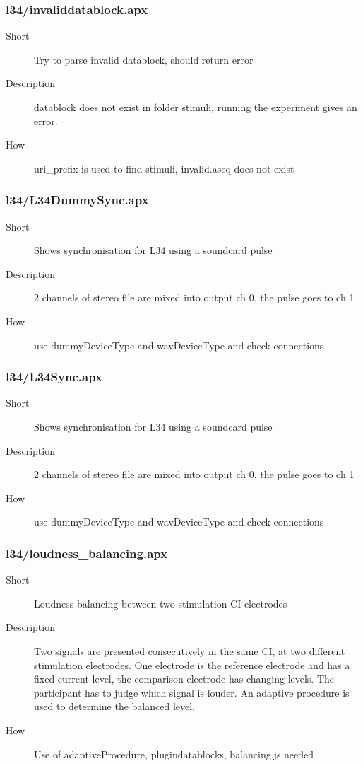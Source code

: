 \subsubsection{l34/invaliddatablock.apx}
\begin{description}
\item[Short] 
 Try to parse invalid datablock, should return error
\item[Description] 
 datablock does not exist in folder stimuli, running the experiment gives an error.
\item[How] 
 uri\_prefix is used to find stimuli, invalid.aseq does not exist
\end{description}

\subsubsection{l34/L34DummySync.apx}
\begin{description}
\item[Short] 
        Shows synchronisation for L34 using a soundcard pulse
\item[Description] 
         2 channels of stereo file are mixed into output ch 0, the pulse goes to ch 1
\item[How] 
 use dummyDeviceType and wavDeviceType and check connections
\end{description}

\subsubsection{l34/L34Sync.apx}
\begin{description}
\item[Short] 
        Shows synchronisation for L34 using a soundcard pulse
\item[Description] 
         2 channels of stereo file are mixed into output ch 0, the pulse goes to ch 1
\item[How] 
 use dummyDeviceType and wavDeviceType and check connections
\end{description}

\subsubsection{l34/loudness\_balancing.apx}
\begin{description}
\item[Short] 
 Loudness balancing between two stimulation CI electrodes
\item[Description] 
 Two signals are presented consecutively in the same CI, at two different stimulation electrodes. One electrode is the reference electrode and has a fixed current level, the comparison electrode has changing levels. The participant has to judge which signal is louder. An adaptive procedure is used to determine the balanced level.
\item[How] 
 Use of adaptiveProcedure, plugindatablocks, balancing.js needed
\end{description}

